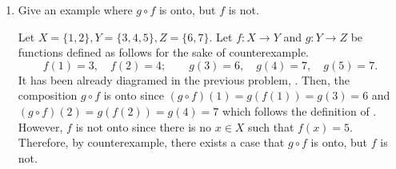 \begin{enumerate}
\begin{enumerate}
    \item Give an example where $g \circ f$ is onto, but $f$ is not.
    \begin{subanswer}
      Let $X=\{1,2\}, Y=\{3,4,5\}, Z=\{6,7\}$. 
      Let $f: X \rightarrow Y$ and $g: Y \rightarrow Z$ be functions defined as follows for the sake of counterexample.
      \[
        f(1)=3, \quad f(2)=4; \qquad g(3)=6, \quad g(4)=7, \quad g(5)=7.
      \]
      It has been already diagramed in the previous problem, .
      Then, the composition $g \circ f$ is onto since 
      $(g \circ f)(1) = g(f(1)) = g(3) = 6$ and $(g \circ f)(2) = g(f(2)) = g(4) = 7$ which follows the definition of .
      However, $f$ is not onto since there is no $x \in X$ such that $f(x) = 5$.\proofstep
      Therefore, by counterexample, there exists a case that $g \circ f$ is onto, but $f$ is not.
    \end{subanswer}
  \end{enumerate}



\end{enumerate}
